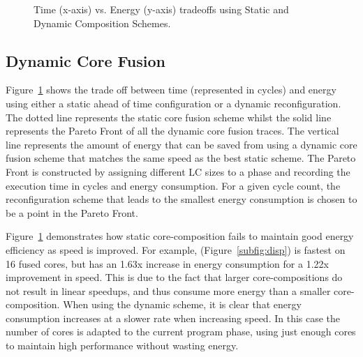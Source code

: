 \begin{figure}[t]
     \caption{Time (x-axis) vs. Energy (y-axis) tradeoffs using Static and Dynamic Composition Schemes.}
     \label{fig:paretos}
	 	 	 	 \vspace{1em}
\end{figure}

\subsection{Dynamic Core Fusion}
Figure~\ref{fig:paretos} shows the trade off between time (represented in cycles) and energy using either a static ahead of time configuration or a dynamic reconfiguration.
The dotted line represents the static core fusion scheme whilst the solid line represents the Pareto Front of all the dynamic core fusion traces.
The vertical line represents the amount of energy that can be saved from using a dynamic core fusion scheme that matches the same speed as the best static scheme.
The Pareto Front is constructed by assigning different LC sizes to a phase and recording the execution time in cycles and energy consumption.
For a given cycle count, the reconfiguration scheme that leads to the smallest energy consumption is chosen to be a point in the Pareto Front.

Figure~\ref{fig:paretos} demonstrates how static core-composition fails to maintain good energy efficiency as speed is improved.
For example,  (Figure~\ref{subfig:disp}) is fastest on 16 fused cores, but has an 1.63x increase in energy consumption for a 1.22x improvement in speed.
This is due to the fact that larger core-compositions do not result in linear speedups, and thus consume more energy than a smaller core-composition.
When using the dynamic scheme, it is clear that energy consumption increases at a slower rate when increasing speed.
In this case the number of cores is adapted to the current program phase, using just enough cores to maintain high performance without wasting energy.

